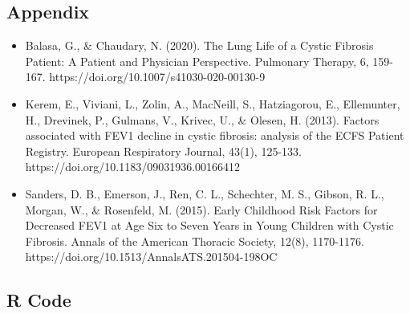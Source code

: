 \documentclass{article}
\begin{document}
		\subsection*{Appendix}
		\begin{itemize}
			\item Balasa, G., \& Chaudary, N. (2020). The Lung Life of a Cystic Fibrosis Patient: A Patient and Physician Perspective. Pulmonary Therapy, 6, 159-167. 
			https://doi.org/10.1007/s41030-020-00130-9
			\item Kerem, E., Viviani, L., Zolin, A., MacNeill, S., Hatziagorou, E., Ellemunter, H., Drevinek, P., Gulmans, V., Krivec, U., \& Olesen, H. (2013). Factors associated with FEV1 decline in cystic fibrosis: analysis of the ECFS Patient Registry. European Respiratory Journal, 43(1), 125-133. 
			https://doi.org/10.1183/09031936.00166412
			\item Sanders, D. B., Emerson, J., Ren, C. L., Schechter, M. S., Gibson, R. L., Morgan, W., \& Rosenfeld, M. (2015). Early Childhood Risk Factors for Decreased FEV1 at Age Six to Seven Years in Young Children with Cystic Fibrosis. Annals of the American Thoracic Society, 12(8), 1170-1176. 
			https://doi.org/10.1513/AnnalsATS.201504-198OC
		\end{itemize}

		\subsection*{R Code}
\end{document}
